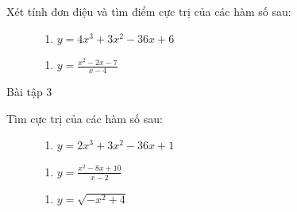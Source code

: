 \documentclass[
]{article}
\providecommand{\tightlist}{%
  \setlength{\itemsep}{0pt}\setlength{\parskip}{0pt}}\usepackage{longtable,booktabs,array}
\begin{document}
\begin{tcolorbox}
Xét tính đơn điệu và tìm điểm cực trị của các hàm số sau:

\begin{figure}

\begin{minipage}{0.33\linewidth}

\begin{enumerate}
\def\labelenumi{\alph{enumi}.}
\tightlist
\item
  \(y=4x^3+3x^2-36x+6\)
\end{enumerate}

\end{minipage}%
%
\begin{minipage}{0.33\linewidth}

\begin{enumerate}
\def\labelenumi{\alph{enumi}.}
\setcounter{enumi}{1}
\tightlist
\item
  \(y=\frac{x^2-2x-7}{x-4}\)
\end{enumerate}

\end{minipage}%

\end{figure}%

Bài tập 3

Tìm cực trị của các hàm số sau:

\begin{figure}

\begin{minipage}{0.33\linewidth}

\begin{enumerate}
\def\labelenumi{\alph{enumi}.}
\tightlist
\item
  \(y=2x^3+3x^2-36x+1\)
\end{enumerate}

\end{minipage}%
%
\begin{minipage}{0.33\linewidth}

\begin{enumerate}
\def\labelenumi{\alph{enumi}.}
\setcounter{enumi}{1}
\tightlist
\item
  \(y=\frac{x^2-8x+10}{x-2}\)
\end{enumerate}

\end{minipage}%
%
\begin{minipage}{0.33\linewidth}

\begin{enumerate}
\def\labelenumi{\alph{enumi}.}
\setcounter{enumi}{2}
\tightlist
\item
  \(y=\sqrt{-x^2+4}\)
\end{enumerate}


\end{minipage}
\end{figure}
\end{tcolorbox}
\end{document}
